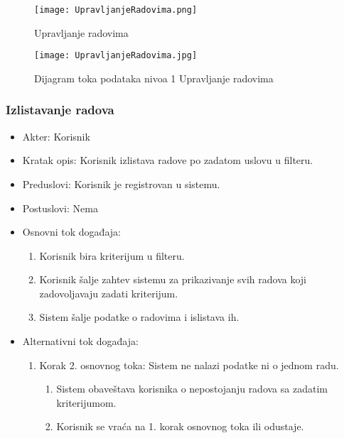 \documentclass[a4paper]{article}
\begin{document}
\begin{figure}[hbt!]
    \centering
    \texttt{[image: UpravljanjeRadovima.png]}
    \caption{Upravljanje radovima}
    \label{fig:my_label}
\end{figure}


\begin{figure}[hbt!]
    \center
    \texttt{[image: UpravljanjeRadovima.jpg]}
    \caption{Dijagram toka podataka nivoa 1 Upravljanje radovima}
    \label{fig:my_label}
\end{figure}

\subsubsection{Izlistavanje radova}
\begin{itemize}
    \item Akter: Korisnik
    \item Kratak opis: Korisnik izlistava radove po zadatom uslovu u filteru.
    \item Preduslovi: Korisnik je registrovan u sistemu.
    \item Postuslovi: Nema
    \item Osnovni tok događaja:
        \begin{enumerate}
            \item Korisnik bira kriterijum u filteru.
            \item Korisnik šalje zahtev sistemu za prikazivanje svih radova koji zadovoljavaju zadati kriterijum.
            \item Sistem šalje podatke o radovima i islistava ih.
        \end{enumerate}
    \item Alternativni tok događaja:
        \begin{enumerate}
            \item Korak 2. osnovnog toka: Sistem ne nalazi podatke ni o jednom radu.
            \begin{enumerate}
                \item Sistem obaveštava korisnika o nepostojanju radova sa zadatim kriterijumom.
                \item Korisnik se vraća na 1. korak osnovnog toka ili odustaje.
            \end{enumerate}
        \end{enumerate}
\end{itemize}
\end{document}
